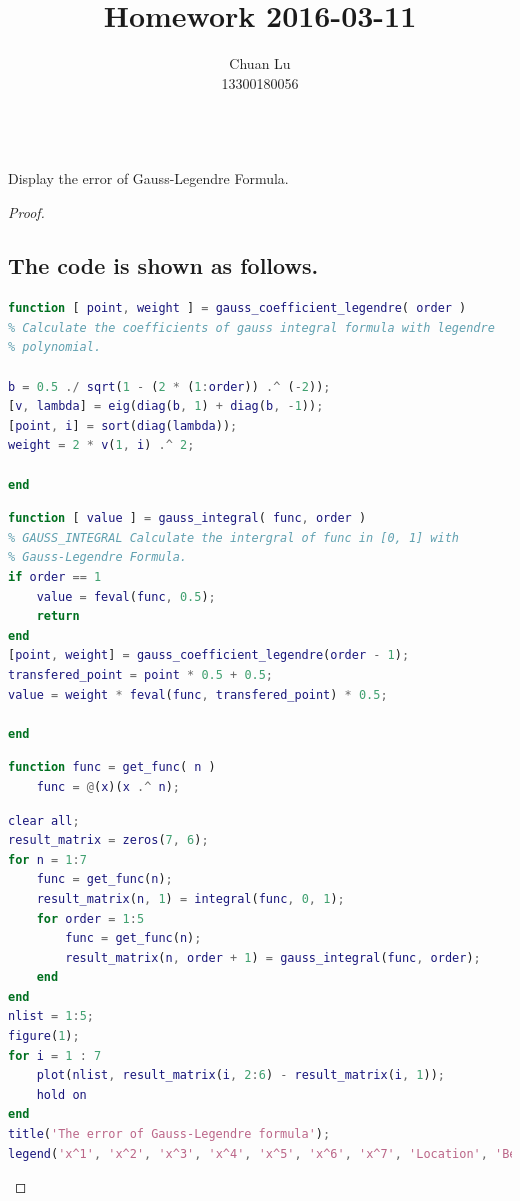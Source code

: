 \documentclass{article}
\newenvironment{problem}[2][Problem]{\begin{trivlist}
\item[\hskip \labelsep {\bfseries #1}\hskip \labelsep {\bfseries #2.}]}{\end{trivlist}}
\begin{document}
\title{Homework 2016-03-11}
\author{Chuan Lu\\
13300180056}

\maketitle

\begin{problem}{1}
\text{ }\\
Display the error of Gauss-Legendre Formula.
\end{problem}

\begin{proof}
\subsection{The code is shown as follows.}
\begin{lstlisting}[language={MATLAB}]
function [ point, weight ] = gauss_coefficient_legendre( order )
% Calculate the coefficients of gauss integral formula with legendre
% polynomial.

b = 0.5 ./ sqrt(1 - (2 * (1:order)) .^ (-2));
[v, lambda] = eig(diag(b, 1) + diag(b, -1));
[point, i] = sort(diag(lambda));
weight = 2 * v(1, i) .^ 2;

end
\end{lstlisting}

\begin{lstlisting}[language={MATLAB}]
function [ value ] = gauss_integral( func, order )
% GAUSS_INTEGRAL Calculate the intergral of func in [0, 1] with
% Gauss-Legendre Formula.
if order == 1
    value = feval(func, 0.5);
    return
end
[point, weight] = gauss_coefficient_legendre(order - 1);
transfered_point = point * 0.5 + 0.5;
value = weight * feval(func, transfered_point) * 0.5;

end
\end{lstlisting}

\begin{lstlisting}[language = {MATLAB}]
% get function
function func = get_func( n )
    func = @(x)(x .^ n);
\end{lstlisting}

\begin{lstlisting}[language = {MATLAB}]
% homework 4
clear all;
result_matrix = zeros(7, 6);
for n = 1:7
    func = get_func(n);
    result_matrix(n, 1) = integral(func, 0, 1);
    for order = 1:5
        func = get_func(n);
        result_matrix(n, order + 1) = gauss_integral(func, order);
    end
end
nlist = 1:5;
figure(1);
for i = 1 : 7
    plot(nlist, result_matrix(i, 2:6) - result_matrix(i, 1));
    hold on
end
title('The error of Gauss-Legendre formula');
legend('x^1', 'x^2', 'x^3', 'x^4', 'x^5', 'x^6', 'x^7', 'Location', 'Best');
\end{lstlisting}


\end{proof}
\end{document}
